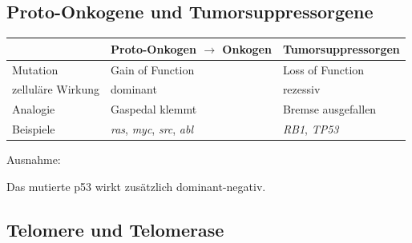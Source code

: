 

\subsection{Proto-Onkogene und Tumorsuppressorgene}\label{subsec:proto-onkogene-und-tumorsuppressorgene}

\begin{mytable}
    \begin{tabular}{|l|l|l|}
        \hline
        & \textbf{Proto-Onkogen $\rightarrow$ Onkogen} &
        \textbf{Tumorsuppressorgen} \\
        \hline
        Mutation &
        Gain of Function &
        Loss of Function \\

        zelluläre Wirkung &
        dominant &
        rezessiv \\

        Analogie &
        Gaspedal klemmt &
        Bremse ausgefallen \\

        Beispiele &
        \textit{ras}, \textit{myc},
        \textit{src}, \textit{abl} &
        \textit{RB1}, \textit{TP53} \\
        \hline
    \end{tabular}
\end{mytable}

Ausnahme:

Das mutierte p53 wirkt zusätzlich dominant-negativ.


\subsection*{Telomere und Telomerase}\label{subsec:telomere-und-telomerase}

